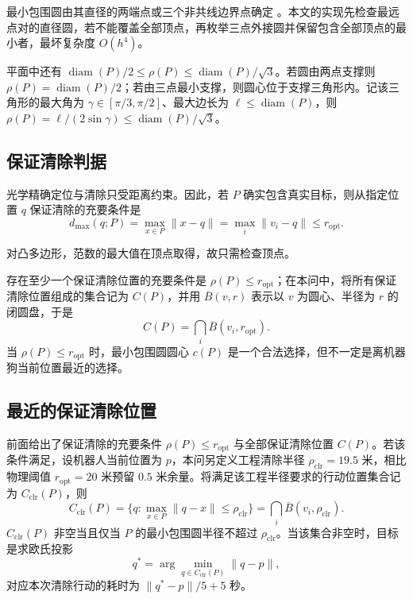 \documentclass[UTF8,a4paper,zihao=-4,fontset=none]{ctexart}
\begin{document}
最小包围圆由其直径的两端点或三个非共线边界点确定 \cite{Welzl1991}。本文的实现先检查最远点对的直径圆，若不能覆盖全部顶点，再枚举三点外接圆并保留包含全部顶点的最小者，最坏复杂度 \(O(h^4)\)。

平面中还有 \(\operatorname{diam}(P)/2\le\rho(P)\le\operatorname{diam}(P)/\sqrt3\)。若圆由两点支撑则 \(\rho(P)=\operatorname{diam}(P)/2\)；若由三点最小支撑，则圆心位于支撑三角形内。记该三角形的最大角为 \(\gamma\in[\pi/3,\pi/2]\)、最大边长为 \(\ell\le\operatorname{diam}(P)\)，则 \(\rho(P)=\ell/(2\sin\gamma)\le\operatorname{diam}(P)/\sqrt3\)。

\subsection{保证清除判据}

光学精确定位与清除只受距离约束。因此，若 \(P\) 确实包含真实目标，则从指定位置 \(q\) 保证清除的充要条件是
\begin{equation}
  d_{\max}(q;P)=\max_{x\in P}\lVert x-q\rVert=\max_i\lVert v_i-q\rVert\le r_{\mathrm{opt}} .
  \label{eq:clear-condition}
\end{equation}

对凸多边形，范数的最大值在顶点取得，故只需检查顶点。

存在至少一个保证清除位置的充要条件是 \(\rho(P)\le r_{\mathrm{opt}}\)；在本问中，将所有保证清除位置组成的集合记为 \(C(P)\)，并用 \(\overline B(v,r)\) 表示以 \(v\) 为圆心、半径为 \(r\) 的闭圆盘，于是
\begin{equation}
  C(P)=\bigcap_i\overline{B}(v_i,r_{\mathrm{opt}}).
  \label{eq:clear-set}
\end{equation}
当 \(\rho(P)\le r_{\mathrm{opt}}\) 时，最小包围圆圆心 \(c(P)\) 是一个合法选择，但不一定是离机器狗当前位置最近的选择。

\subsection{最近的保证清除位置}

前面给出了保证清除的充要条件 \(\rho(P)\le r_{\mathrm{opt}}\) 与全部保证清除位置 \(C(P)\)。若该条件满足，设机器人当前位置为 \(p\)，本问另定义工程清除半径 \(\rho_{\mathrm{clr}}=19.5\) 米，相比物理阈值 \(r_{\mathrm{opt}}=20\) 米预留 \(0.5\) 米余量。将满足该工程半径要求的行动位置集合记为 \(C_{\mathrm{clr}}(P)\)，则
\begin{equation}
  C_{\mathrm{clr}}(P)=\{q:\max_{x\in P}\lVert q-x\rVert\le\rho_{\mathrm{clr}}\}
  =\bigcap_{i}\overline{B}(v_i,\rho_{\mathrm{clr}}).
  \label{eq:clear-proj}
\end{equation}
\(C_{\mathrm{clr}}(P)\) 非空当且仅当 \(P\) 的最小包围圆半径不超过 \(\rho_{\mathrm{clr}}\)。当该集合非空时，目标是求欧氏投影
\begin{equation}
  q^*=\arg\min_{q\in C_{\mathrm{clr}}(P)}\lVert q-p\rVert ,
\end{equation}
对应本次清除行动的耗时为 \(\lVert q^*-p\rVert/5+5\) 秒。
\end{document}
